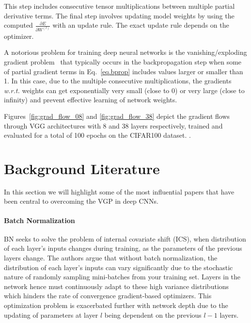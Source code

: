 \documentclass{article}
\begin{document}
This step includes consecutive tensor multiplications between multiple
partial derivative terms.
The final step involves updating model weights by using the computed 
$\frac{\partial E}{\partial W^{(l)}}$ with an update rule.
The exact update rule depends on the optimizer.

A notorious problem for training deep neural networks is the vanishing/exploding gradient
problem~\cite{bengio1993problem} that typically occurs in the backpropagation step when some of partial gradient terms in Eq.~\ref{eq.bprop} includes values larger or smaller than 1.
In this case, due to the multiple consecutive multiplications, the gradients \textit{w.r.t.} weights can get exponentially very small (close to 0) or very large (close to infinity) and
prevent effective learning of network weights.


%


Figures~\ref{fig:grad_flow_08} and \ref{fig:grad_flow_38} depict the gradient flows through VGG architectures \cite{simonyan2014very} with 8 and 38 layers respectively, trained and evaluated for a total of 100 epochs on the CIFAR100 dataset. \questionOne.


\section{Background Literature}
\label{sec:lit_rev}
In this section we will highlight some of the most influential
papers that have been central to overcoming the VGP in
deep CNNs.

\paragraph{Batch Normalization}\cite{ioffe2015batch}
BN seeks to solve the  problem of 
internal covariate shift (ICS), when distribution of each layer’s 
inputs changes during training, as the parameters of the previous layers change. 
The authors argue that without batch normalization, the distribution of
each layer’s inputs can vary significantly due to the  stochastic nature of randomly sampling mini-batches from your
training set. 
Layers in the network hence must continuously adapt to these high variance distributions which hinders the rate of convergence gradient-based optimizers.
This optimization problem is exacerbated further with network depth due
to the updating of parameters at layer $l$ being dependent on
the previous $l-1$ layers.
\end{document}
